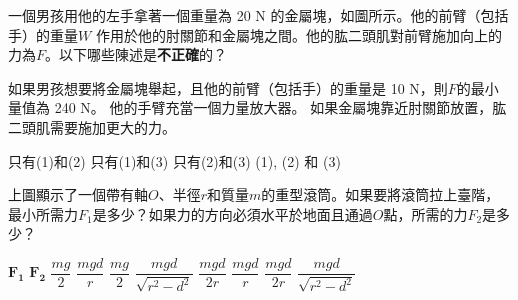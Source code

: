 {
     \bigskip
    一個男孩用他的左手拿著一個重量為 20 N 的金屬塊，如圖所示。他的前臂（包括手）的重量$W$ 作用於他的肘關節和金屬塊之間。他的肱二頭肌對前臂施加向上的力為$F$。以下哪些陳述是\textbf{不正確}的？
    \begin{statements}
        \task 如果男孩想要將金屬塊舉起，且他的前臂（包括手）的重量是 10 N，則$F$的最小量值為 240 N。
        \task 他的手臂充當一個力量放大器。
        \task 如果金屬塊靠近肘關節放置，肱二頭肌需要施加更大的力。
    \end{statements}
    \begin{tasks}
        \task 只有(1)和(2)
        \task 只有(1)和(3)
        \task 只有(2)和(3)
        \task (1), (2) 和 (3)
    \end{tasks}
}{}

{
     \par\bigskip
    上圖顯示了一個帶有軸$O$、半徑$r$和質量$m$的重型滾筒。如果要將滾筒拉上臺階，最小所需力$F_1$是多少？如果力的方向必須水平於地面且通過$O$點，所需的力$F_2$是多少？
    \begin{tasks}
        \task [] $\mathbf{F_1}$ \tab\tab $\mathbf{F_2}$\vspace{.8em}
        \task $\dfrac{mg}{2}$ \tab\tab $\dfrac{mgd}{r}$
        \task $\dfrac{mg}{2}$ \tab\tab $\dfrac{mgd}{\sqrt{r^2-d^2}}$
        \task $\dfrac{mgd}{2r}$ \tab\tab $\dfrac{mgd}{r}$
        \task $\dfrac{mgd}{2r}$ \tab\tab $\dfrac{mgd}{\sqrt{r^2-d^2}}$
    \end{tasks}

}{}